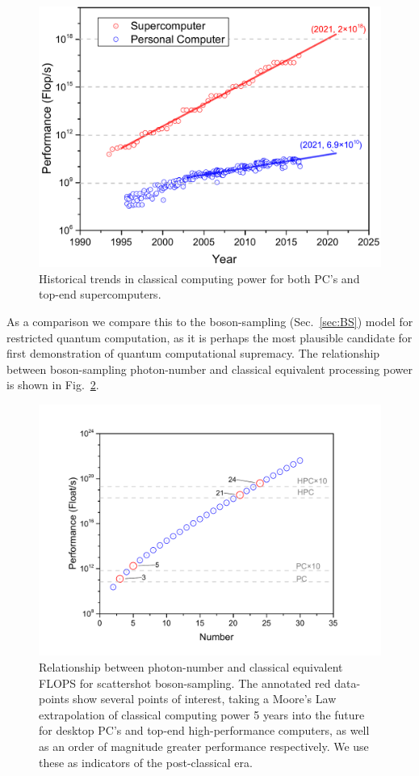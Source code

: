 \documentclass[aps,rmp,twocolumn,amsmath,amssymb,nofootinbib,superscriptaddress,longbibliography,floatfix]{revtex4-1}
\begin{document}
\begin{figure}[!htb]
\includegraphics[width=\columnwidth]{moores_law}
\caption{Historical trends in classical computing power for both PC's and top-end supercomputers.} \label{fig:moores_law}
\end{figure}

As a comparison we compare this to the boson-sampling (Sec.~\ref{sec:BS}) model for restricted quantum computation, as it is perhaps the most plausible candidate for first demonstration of quantum computational supremacy. The relationship between boson-sampling photon-number and classical equivalent processing power is shown in Fig.~\ref{fig:moores_super}.

\begin{figure}[!htb]
\includegraphics[width=\columnwidth]{moores_super}
\caption{Relationship between photon-number and classical equivalent FLOPS for scattershot boson-sampling. The annotated red data-points show several points of interest, taking a Moore's Law extrapolation of classical computing power 5 years into the future for desktop PC's and top-end high-performance computers, as well as an order of magnitude greater performance respectively. We use these as indicators of the post-classical era.} \label{fig:moores_super}
\end{figure}
\end{document}
